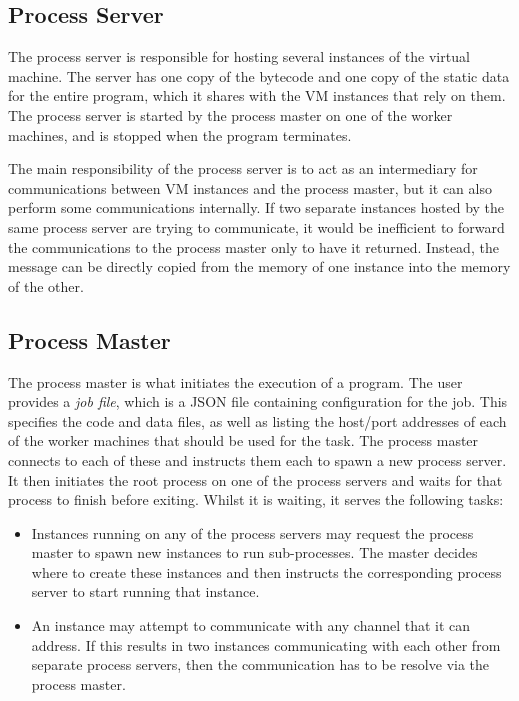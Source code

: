 \subsection{Process Server}

The process server is responsible for hosting several instances of the virtual
machine. The server has one copy of the bytecode and one copy of the static data
for the entire program, which it shares with the VM instances that rely on them.
The process server is started by the process master on one of the worker
machines, and is stopped when the program terminates.

The main responsibility of the process server is to act as an intermediary for
communications between VM instances and the process master, but it can also
perform some communications internally. If two separate instances hosted by the
same process server are trying to communicate, it would be inefficient to
forward the communications to the process master only to have it returned.
Instead, the message can be directly copied from the memory of one instance into
the memory of the other.

\subsection{Process Master} \label{process-master}

The process master is what initiates the execution of a program. The user
provides a \textit{job file}, which is a JSON file containing configuration for
the job. This specifies the code and data files, as well as listing the
host/port addresses of each of the worker machines that should be used for the
task. The process master connects to each of these and instructs them each to
spawn a new process server. It then initiates the root process on one of the
process servers and waits for that process to finish before exiting. Whilst it
is waiting, it serves the following tasks:

\begin{itemize}
  \item
    Instances running on any of the process servers may request the process
    master to spawn new instances to run sub-processes. The master decides where
    to create these instances and then instructs the corresponding process
    server to start running that instance.
  \item
    An instance may attempt to communicate with any channel that it can address.
    If this results in two instances communicating with each other from separate
    process servers, then the communication has to be resolve via the process
    master.
\end{itemize}
